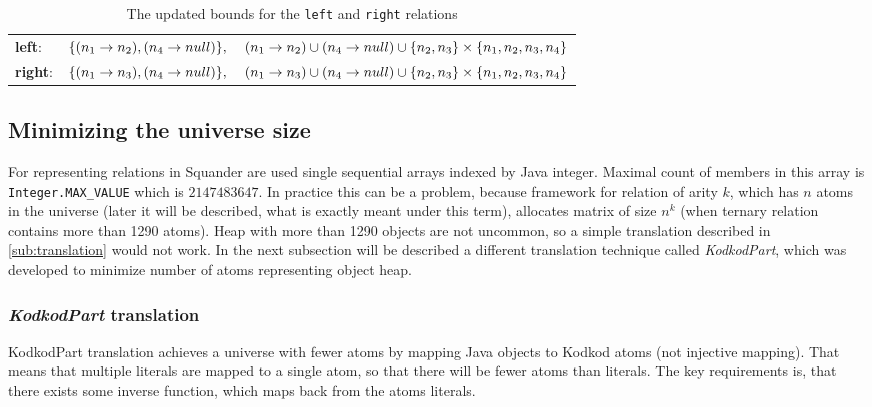 \documentclass[11pt,twoside,a4paper]{book}
\begin{document}
\begin{table}[ht]
\begin{center}
\begin{tabular}{ l l }
	\textbf{left}: &
	$\{(n_1\rightarrow
	n_2),(n_4 \rightarrow
	null)\},\hspace{4mm}(n_1 \rightarrow n_2)\cup(n_4 \rightarrow
	null)\cup \{n_2,n_3\}\times\{n_1,n_2,n_3,n_4\}$\\ 
	\textbf{right}: &
	$\{(n_1\rightarrow
	n_3),(n_4 \rightarrow
	null)\},\hspace{4mm}(n_1 \rightarrow n_3)\cup(n_4 \rightarrow
	null)\cup \{n_2,n_3\}\times\{n_1,n_2,n_3,n_4\}$\\
	
\end{tabular}
\end{center}
\caption{The updated bounds for the \texttt{left} and \texttt{right} relations}
\label{fig:updatedBounds}
\end{table}

\subsection{Minimizing the universe size}
\label{sub:minUniverse}
For representing relations in Squander are used single sequential arrays indexed
by Java integer. Maximal count of members in this array is \verb|Integer.MAX_VALUE| which is
$2147483647$. In practice this can be a problem, because framework for relation
of arity $k$, which has $n$ atoms in the universe (later it will be described,
what is exactly meant under this term), allocates matrix of size $n^k$ (when
ternary relation contains more than 1290 atoms). Heap with more than 1290
objects are not uncommon, so a simple translation described in
\ref{sub:translation} would not work. In the next subsection will be described a
different translation technique called \textit{KodkodPart}, which was developed
to minimize number of atoms representing object heap.

\subsubsection{\textit{KodkodPart} translation}
\label{sub:kodkodpart}
KodkodPart translation achieves a universe with fewer atoms by mapping
Java objects to Kodkod atoms (not injective mapping). That means that multiple
literals are mapped to a single atom, so that there will be fewer atoms than
literals. The key requirements is, that there exists some inverse function,
which maps back from the atoms literals.
\end{document}
